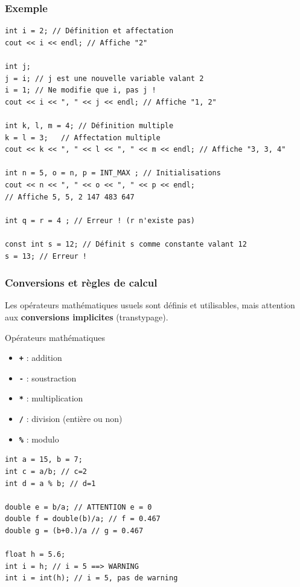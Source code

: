 \begin{frame}[fragile]
	\frametitle{Exemple}
	\begin{verbatim}
int i = 2; // Définition et affectation
cout << i << endl; // Affiche "2"

int j;
j = i; // j est une nouvelle variable valant 2
i = 1; // Ne modifie que i, pas j !
cout << i << ", " << j << endl; // Affiche "1, 2"

int k, l, m = 4; // Définition multiple
k = l = 3;   // Affectation multiple
cout << k << ", " << l << ", " << m << endl; // Affiche "3, 3, 4"

int n = 5, o = n, p = INT_MAX ; // Initialisations
cout << n << ", " << o << ", " << p << endl;
// Affiche 5, 5, 2 147 483 647

int q = r = 4 ; // Erreur ! (r n'existe pas)

const int s = 12; // Définit s comme constante valant 12
s = 13; // Erreur !
	\end{verbatim}
\end{frame}

\begin{frame}[fragile]
	\frametitle{Conversions et règles de calcul}
	
	Les opérateurs mathématiques usuels sont définis et utilisables, mais attention aux \textbf{conversions implicites} (transtypage).
	
	\begin{minipage}{0.42\linewidth}
	\begin{block}{Opérateurs mathématiques}
		\begin{itemize}
			\item \texttt{\textbf{+}} : addition
			\item \texttt{\textbf{-}} : soustraction
			\item \texttt{\textbf{*}} : multiplication
			\item \texttt{\textbf{/}} : division (entière ou non)
			\item \texttt{\textbf{\%}} : modulo
		\end{itemize}
	\end{block}
	\end{minipage}
	\hfill
	\begin{minipage}{0.56\linewidth}
	\begin{verbatim}
int a = 15, b = 7;
int c = a/b; // c=2
int d = a % b; // d=1

double e = b/a; // ATTENTION e = 0
double f = double(b)/a; // f = 0.467
double g = (b+0.)/a // g = 0.467

float h = 5.6;
int i = h; // i = 5 ==> WARNING
int i = int(h); // i = 5, pas de warning
	\end{verbatim}
\end{minipage}
\end{frame}

